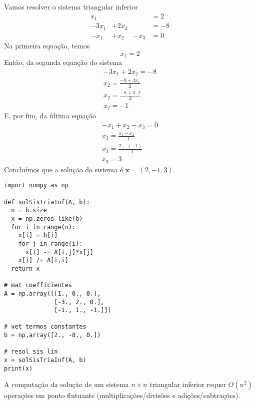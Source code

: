 \begin{ex}
  Vamos resolver o sistema triangular inferior
  \begin{equation}
    \begin{matrix}
      x_1 &&&= 2\\
      -3x_1 &+ 2x_2 &&= -8\\
      -x_1 &+ x_2 &- x_3 &= 0
    \end{matrix}
  \end{equation}
  Na primeira equação, temos
  \begin{equation}
    x_1 = 2
  \end{equation}
  Então, da segunda equação do sistema
  \begin{gather}
    -3x_1 + 2x_2 = -8\\
    x_2 = \frac{-8 + 3x_1}{2}\\
    x_2 = \frac{-8 + 3\cdot 2}{2}\\
    x_2 = -1
  \end{gather}
  E, por fim, da última equação
  \begin{gather}
    -x_1 + x_2 - x_3 = 0\\
    x_3 = \frac{x_1 - x_2}{-1}\\
    x_3 = \frac{2 - (-1)}{-1}\\
    x_3 = 3
  \end{gather}
  Concluímos que a solução do sistema é $\pmb{x} = (2, -1, 3)$.

\begin{lstlisting}[caption=solSisTriaInf.py, label=cap_sislin_sec_lu:cod:solSisTriaInf]
import numpy as np

def solSisTriaInf(A, b):
  n = b.size
  x = np.zeros_like(b)
  for i in range(n):
    x[i] = b[i]
    for j in range(i):
      x[i] -= A[i,j]*x[j]
    x[i] /= A[i,i]
  return x    

# mat coefficientes
A = np.array([[1., 0., 0.],
              [-3., 2., 0.],
              [-1., 1., -1.]])

# vet termos constantes
b = np.array([2., -8., 0.])

# resol sis lin
x = solSisTriaInf(A, b)
print(x)
\end{lstlisting}

\end{ex}

\begin{obs}
  A computação da solução de um sistema $n\times n$ triangular inferior requer $O(n^2)$ operações em ponto flutuante (multiplicações/divisões e adições/subtrações).
\end{obs}


